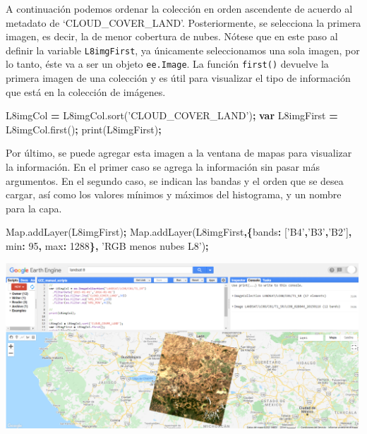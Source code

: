 \documentclass[
]{article}
\newenvironment{Shaded}{\begin{snugshade}}{\end{snugshade}}
\newcommand{\AttributeTok}[1]{\textcolor[rgb]{0.77,0.63,0.00}{#1}}
\newcommand{\DataTypeTok}[1]{\textcolor[rgb]{0.13,0.29,0.53}{#1}}
\newcommand{\DecValTok}[1]{\textcolor[rgb]{0.00,0.00,0.81}{#1}}
\newcommand{\KeywordTok}[1]{\textcolor[rgb]{0.13,0.29,0.53}{\textbf{#1}}}
\newcommand{\NormalTok}[1]{#1}
\newcommand{\OperatorTok}[1]{\textcolor[rgb]{0.81,0.36,0.00}{\textbf{#1}}}
\newcommand{\StringTok}[1]{\textcolor[rgb]{0.31,0.60,0.02}{#1}}
\newcommand{\VariableTok}[1]{\textcolor[rgb]{0.00,0.00,0.00}{#1}}
\begin{document}
A continuación podemos ordenar la colección en orden ascendente de
acuerdo al metadato de `CLOUD\_COVER\_LAND'. Posteriormente, se
selecciona la primera imagen, es decir, la de menor cobertura de nubes.
Nótese que en este paso al definir la variable \texttt{L8imgFirst}, ya
únicamente seleccionamos una sola imagen, por lo tanto, éste va a ser un
objeto \texttt{ee.Image}. La función \texttt{first()} devuelve la
primera imagen de una colección y es útil para visualizar el tipo de
información que está en la colección de imágenes.

\begin{Shaded}
\begin{Highlighting}[]
\NormalTok{L8imgCol }\OperatorTok{=} \VariableTok{L8imgCol}\NormalTok{.}\AttributeTok{sort}\NormalTok{(}\StringTok{'CLOUD_COVER_LAND'}\NormalTok{)}\OperatorTok{;}
\KeywordTok{var}\NormalTok{ L8imgFirst }\OperatorTok{=} \VariableTok{L8imgCol}\NormalTok{.}\AttributeTok{first}\NormalTok{()}\OperatorTok{;} 
\AttributeTok{print}\NormalTok{(L8imgFirst)}\OperatorTok{;}
\end{Highlighting}
\end{Shaded}

Por último, se puede agregar esta imagen a la ventana de mapas para
visualizar la información. En el primer caso se agrega la información
sin pasar más argumentos. En el segundo caso, se indican las bandas y el
orden que se desea cargar, así como los valores mínimos y máximos del
histograma, y un nombre para la capa.

\begin{Shaded}
\begin{Highlighting}[]
\VariableTok{Map}\NormalTok{.}\AttributeTok{addLayer}\NormalTok{(L8imgFirst)}\OperatorTok{;}
\VariableTok{Map}\NormalTok{.}\AttributeTok{addLayer}\NormalTok{(L8imgFirst}\OperatorTok{,\{}\DataTypeTok{bands}\OperatorTok{:}\NormalTok{ [}\StringTok{'B4'}\OperatorTok{,}\StringTok{'B3'}\OperatorTok{,}\StringTok{'B2'}\NormalTok{]}\OperatorTok{,} \DataTypeTok{min}\OperatorTok{:} \DecValTok{95}\OperatorTok{,} \DataTypeTok{max}\OperatorTok{:} \DecValTok{1288}\OperatorTok{\},} \StringTok{'RGB menos nubes L8'}\NormalTok{)}\OperatorTok{;}
\end{Highlighting}
\end{Shaded}

\includegraphics[width=500px]{Img/RGBIm}
\end{document}

